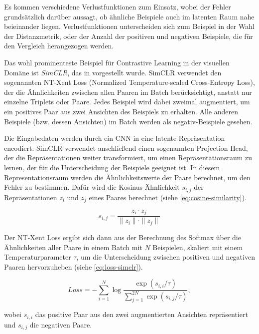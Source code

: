 Es kommen verschiedene Verlustfunktionen zum Einsatz, wobei der Fehler grundsätzlich darüber aussagt, ob ähnliche Beispiele auch im latenten Raum nahe beieinander liegen. Verlustfunktionen unterscheiden sich zum Beispiel in der Wahl der Distanzmetrik, oder der Anzahl der positiven und negativen Beispiele, die für den Vergleich herangezogen werden.

Das wohl prominenteste Beispiel für Contrastive Learning in der visuellen Domäne ist \emph{SimCLR}, das in \parencite{Chen2020simclr} vorgestellt wurde. SimCLR verwendet den sogenannten NT-Xent Loss (Normalized Temperature-scaled Cross-Entropy Loss), der die Ähnlichkeiten zwischen allen Paaren im Batch berücksichtigt, anstatt nur einzelne Triplets oder Paare. Jedes Beispiel wird dabei zweimal augmentiert, um ein positives Paar aus zwei Ansichten des Beispiels zu erhalten. Alle anderen Beispiele (bzw. dessen Ansichten) im Batch werden als negativ-Beispiele gesehen.

Die Eingabedaten werden durch ein CNN in eine latente Repräsentation encodiert. SimCLR verwendet anschließend einen sogenannten Projection Head, der die Repräsentationen weiter transformiert, um einen Repräsentationsraum zu lernen, der für die Unterscheidung der Beispiele geeignet ist. In diesem Representationsraum werden die Ähnlichkeitswerte der Paare berechnet, um den Fehler zu bestimmen. Dafür wird die Kosinus-Ähnlichkeit $s_{i,j}$ der Repräsentationen $z_i$ und $z_j$ eines Paares berechnet (siehe \autoref{eq:cosine-similarity}).

\begin{equation}
	s_{i,j} = \frac{z_i \cdot z_j}{\|z_i\| \cdot \|z_j\|}
	\label{eq:cosine-similarity}
\end{equation}

Der NT-Xent Loss ergibt sich dann aus der Berechnung des Softmax über die Ähnlichkeiten aller Paare in einem Batch mit $N$ Beispielen, skaliert mit einem Temperaturparameter $\tau$, um die Unterscheidung zwischen positiven und negativen Paaren hervorzuheben (siehe \autoref{eq:loss-simclr}).

\begin{equation}
	Loss = - \sum_{i=1}^N \log \frac{\exp(s_{i,i}/\tau)}{\sum_{j=1}^{2N} \exp(s_{i,j}/\tau)},
	\label{eq:loss-simclr}
\end{equation} %

wobei $s_{i,i}$ das positive Paar aus den zwei augmentierten Ansichten repräsentiert und $s_{i,j}$ die negativen Paare.

